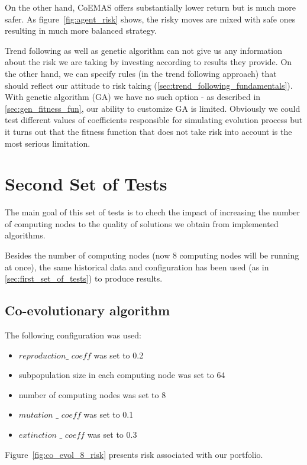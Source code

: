 On the other hand, CoEMAS offers substantially lower return but is much more safer.
As figure~\ref{fig:agent_risk} shows, the risky moves are mixed with safe ones resulting in much more balanced strategy.

Trend following as well as genetic algorithm can not give us any information about the risk we are taking by investing according to results they provide.
On the other hand, we can specify rules (in the trend following approach) that should reflect our attitude to risk taking (\ref{sec:trend_following_fundamentals}).
With genetic algorithm (GA) we have no such option - as described in \ref{sec:gen_fitness_fun}, our ability to customize GA is limited.
Obviously we could test different values of coefficients responsible for simulating evolution process but it turns out that the fitness function that does not take risk into
account is the most serious limitation.


\section{Second Set of Tests}

The main goal of this set of tests is to chech the impact of increasing the number of computing nodes to the quality of solutions we obtain from implemented algorithms.

Besides the number of computing nodes (now 8 computing nodes will be running at once), the same historical data and configuration has been
 used (as in \ref{sec:first_set_of_tests}) to produce results.



\subsection{Co-evolutionary algorithm}

The following configuration was used:
\begin{itemize}
  \item $reproduction\_$ $coeff$ was set to 0.2
  \item subpopulation size in each computing node was set to 64
  \item number of computing nodes was set to 8
  \item $mutation$ $\_$ $coeff$ was set to 0.1
  \item $extinction$ $\_$ $coeff$ was set to 0.3
\end{itemize}

Figure~\ref{fig:co_evol_8_risk} presents risk associated with our portfolio.

